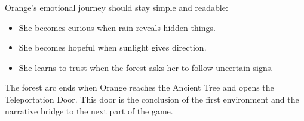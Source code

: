 \documentclass[12pt]{article}
\begin{document}
Orange's emotional journey should stay simple and readable:

\begin{itemize}[leftmargin=*]
    \item She becomes curious when rain reveals hidden things.
    \item She becomes hopeful when sunlight gives direction.
    \item She learns to trust when the forest asks her to follow uncertain signs.
\end{itemize}

The forest arc ends when Orange reaches the Ancient Tree and opens the Teleportation Door. This door is the conclusion of the first environment and the narrative bridge to the next part of the game.
\end{document}
